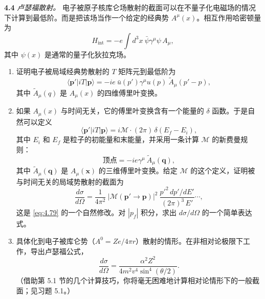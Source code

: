 \textbf{4.4} \emph{卢瑟福散射。} 电子被原子核库仑场散射的截面可以在不量子化电磁场的情况下计算到最低阶。而是把该场当作一个给定的经典势 $A^\mu(x)$。相互作用哈密顿量为
\begin{equation}
  H_{\mathrm{int}} = -e\int d^3x\ \bar{\psi}\gamma^\mu\psi\,A_\mu ,
\end{equation}
其中 $\psi(x)$ 是通常的量子化狄拉克场。
\begin{enumerate}[label=(\alph*)]
  \item 证明电子被局域经典势散射的 $T$ 矩阵元到最低阶为
    \begin{equation}
      \langle \mathbf{p}'|iT|\mathbf{p}\rangle
        = -ie\ \bar{u}(p')\gamma^\mu u(p)\ \tilde{A}_\mu(p'-p) ,
    \end{equation}
    其中 $\tilde{A}_\mu(q)$ 是 $A_\mu(x)$ 的四维傅里叶变换。
  \item 如果 $A_\mu(x)$ 与时间无关，它的傅里叶变换含有一个能量的 $\delta$ 函数。于是自然可以定义
    \begin{equation}
      \langle \mathbf{p}'|iT|\mathbf{p}\rangle
        = i\mathcal{M}\cdot(2\pi)\,\delta(E_f - E_i) ,
    \end{equation}
    其中 $E_i$ 和 $E_f$ 是粒子的初能量和末能量，并采用一条计算 $\mathcal{M}$ 的新费曼规则：
    \begin{equation}
      \text{顶点} = -ie\gamma^\mu\ \tilde{A}_\mu(\mathbf{q}),
    \end{equation}
    其中 $\tilde{A}_\mu(\mathbf{q})$ 是 $A_\mu(\mathbf{x})$ 的三维傅里叶变换。给定 $\mathcal{M}$ 的这个定义，证明被与时间无关的局域势散射的截面为
    \begin{equation}
      \frac{d\sigma}{d\Omega} = \frac{1}{4\pi^2}\ |\mathcal{M}
        (\mathbf{p}'\to\mathbf{p})|^2\ \frac{p'^2\,dp'/dE'}{(2\pi)^3\,E'}
        \cdots ,
    \end{equation}
    这是 \eqref{eq:4.79} 的一个自然修改。对 $|p_f|$ 积分，求出 $d\sigma/d\Omega$ 的一个简单表达式。
  \item 具体化到电子被库仑势（$A^0 = Ze/4\pi r$）散射的情形。在非相对论极限下工作，导出卢瑟福公式，
    \begin{equation}
      \frac{d\sigma}{d\Omega} = \frac{\alpha^2Z^2}
        {4m^2v^4\sin^4(\theta/2)} .
    \end{equation}
    （借助第 5.1 节的几个计算技巧，你将毫无困难地计算相对论情形下的一般截面；见习题 5.1。）
\end{enumerate}
